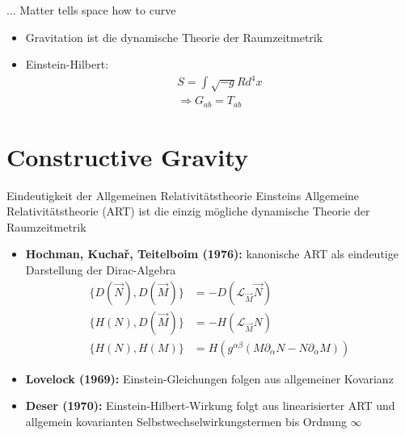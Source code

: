 \documentclass{beamer}
\begin{document}
    \begin{frame}{... Matter tells space how to curve}
        \begin{itemize}
            \item Gravitation ist die dynamische Theorie der Raumzeitmetrik \pause
            \item Einstein-Hilbert:
            \begin{gather*}
                S = \int \sqrt{-g} R d^4 x \\
                \Rightarrow G_{ab} = T_{ab}
            \end{gather*}
        \end{itemize}
    \end{frame}


    \section{Constructive Gravity}\label{sec:constructive-gravity}

    \begin{frame}{Eindeutigkeit der Allgemeinen Relativitätstheorie}
        Einsteins Allgemeine Relativitätstheorie (ART) ist die einzig mögliche dynamische Theorie
        der Raumzeitmetrik \pause
        \begin{itemize}
            \setlength{\belowdisplayskip}{-10pt}
            \item \textbf{Hochman, Kuchař, Teitelboim (1976):} kanonische ART als eindeutige Darstellung der Dirac-Algebra
            \begin{align*}
                \{ D(\vec N), D(\vec M) \} &= -D(\mathcal L_{\vec M} \vec N) \\
                \{ H(N), D(\vec M) \} &= -H(\mathcal L_{\vec M} N) \\
                \{ H(N), H(M) \} &= H(g^{\alpha\beta}(M\partial_\alpha N - N\partial_\alpha M))
            \end{align*} \pause
            \item \textbf{Lovelock (1969):} Einstein-Gleichungen folgen aus allgemeiner Kovarianz \pause
            \item \textbf{Deser (1970):} Einstein-Hilbert-Wirkung folgt aus linearisierter ART und allgemein kovarianten
            Selbstwechselwirkungstermen bis Ordnung $\infty$
        \end{itemize}
    \end{frame}
\end{document}
